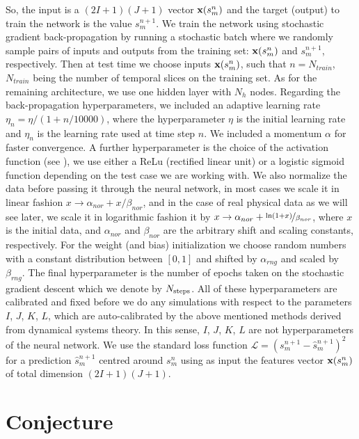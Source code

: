 \documentclass[journal]{IEEEtran}
\begin{document}
So, the input is a
$(2 I+1)(J+1)$ vector ${\bf x}(s^n_m)$ and the target (output) to train the network is the value $s^{n+1}_{m}$.
 We train the network using stochastic gradient
back-propagation by running a stochastic batch
where we randomly sample pairs of inputs and outputs from the training set: ${\bf x}(s^n_m)$ and $s^{n+1}_{m}$, respectively. Then at test time
we choose inputs ${\bf x}(s^n_m)$, such that $n=N_{train}$, $N_{train}$ being the number of temporal slices on the training set.
As for the remaining architecture, we use one hidden layer with $N_h$ nodes.
Regarding the back-propagation hyperparameters, we included an adaptive learning rate $\eta_n=\eta/(1+n/10000)$, 
where the hyperparameter $\eta$ is the initial learning rate and $\eta_n$ is the learning rate used at time step
$n$. We included a momentum $\alpha$ for faster convergence.
 A further hyperparameter is the choice of the activation function (see \cite{9780262527019}), we use either a ReLu (rectified linear unit)
 or a logistic sigmoid function depending on the
 test case we are working with.
We also normalize the data before passing it through the neural network, in most cases we scale it in linear fashion
$x \to \alpha_{nor} + x/\beta_{nor}$, and in the case of real physical data as we will see later, 
we scale it in logarithmic fashion it by $x \to \alpha_{nor}+\nicefrac{\ln(1+x)}{\beta_{nor}}$, where $x$ is the initial data,
and $\alpha_{nor}$ and $\beta_{nor}$ are the arbitrary shift and scaling constants, respectively. For the weight (and bias)
initialization we choose random numbers with a constant distribution between $[0,1]$ and shifted by $\alpha_{rng}$ and scaled
by $\beta_{rng}$. The final hyperparameter is the number of epochs taken on the stochastic gradient descent
which we denote by $N_{\textnormal{steps}}$.  
All of these hyperparameters are calibrated and fixed
before we do any simulations with respect to the parameters $I$, $J$, $K$, $L$, which are auto-calibrated by the above mentioned
methods derived from dynamical systems theory. In this sense, $I$, $J$, $K$, $L$ are not hyperparameters of the neural network. We use the standard
loss function $\mathcal{L}=\left( s^{n+1}_{m} - \hat{s}^{n+1}_{m}\right)^2$ for a prediction $\hat{s}^{n+1}_{m}$ 
centred around $s^{n}_{m}$ using as input
the features vector ${\bf x}(s^n_m)$ of total dimension  $(2 I+1)(J+1)$.




\section{Conjecture}
\label{conjecturesection}
\end{document}

